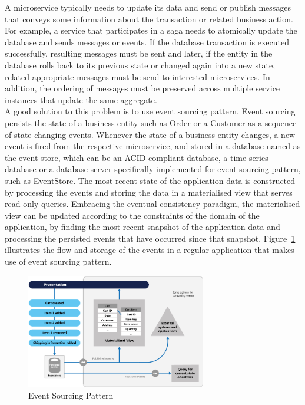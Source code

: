 \documentclass{Configuration_Files/PoliMi3i_thesis}
\begin{document}
A microservice typically needs to update its data and send or publish messages that conveys some information about the transaction or related business action.
For example, a service that participates in a saga needs to atomically update the database and sends messages or events.
If the database transaction is executed successfully, resulting messages must be sent and later, if the entity in the database rolls back to its previous state or changed again into a new state, related appropriate messages must be send to interested microservices.
In addition, the  ordering of messages must be preserved across multiple service instances that update the same aggregate.
\\
A good solution to this problem is to use event sourcing pattern.
Event sourcing persists the state of a business entity such as Order or a Customer as a sequence of state-changing events.
Whenever the state of a business entity changes, a new event is fired from the respective microservice, and stored in a database named as the event store, which can be an ACID-compliant database, a time-series database or a database server specifically implemented for event sourcing pattern, such as EventStore.
The most recent state of the application data is constructed by processing the events and storing the data in a materialised view that serves read-only queries.
Embracing the eventual consistency paradigm, the materialised view can be updated according to the constraints of the domain of the application, by finding the most recent snapshot of the application data and processing the persisted events that have occurred since that snapshot. Figure~\ref{fig:event_sourcing} illustrates the flow and storage of the events in a regular application that makes use of event sourcing pattern.

\begin{figure}[H]
\centering
\includegraphics[width=0.70\textwidth]{myImages/event-sourcing.png}
\caption{Event Sourcing Pattern}
\label{fig:event_sourcing}
\end{figure}
\end{document}
